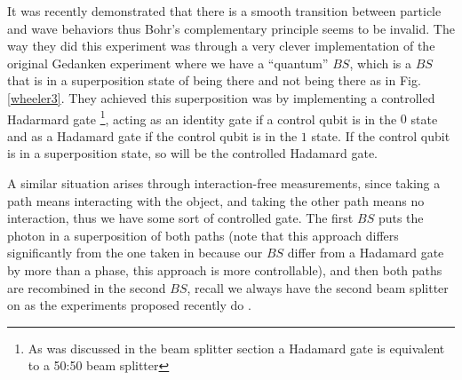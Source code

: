\documentclass[12pt]{book}
\begin{document}
It was recently demonstrated \cite{Peruzzo, Kaiser2012} that there is a smooth transition between particle and wave behaviors thus Bohr's complementary principle seems to be invalid. The way they did this experiment was through a very clever implementation of the original Gedanken experiment where we have a ``quantum'' $BS$, which is a $BS$ that is in a superposition state of being there and not being there as in Fig. \ref{wheeler3}. They achieved this superposition was by implementing a controlled Hadarmard gate \footnote{As was discussed in the beam splitter section a Hadamard gate is equivalent to a 50:50 beam splitter}, acting as an identity gate if a control qubit is in the $0$ state and as a Hadamard gate if the control qubit is in the $1$ state.  If the control qubit is in a superposition state, so will be the controlled Hadamard gate.




A similar situation arises through interaction-free measurements, since taking a path means interacting with the object, and taking the other path means no interaction, thus we have some sort of controlled gate. The first $BS$ puts the photon in a superposition of both paths (note that this approach differs significantly from the one taken in \cite{Peruzzo,Kaiser2012} because our $BS$ differ from a Hadamard gate by more than a phase, this approach is more controllable), and then both paths are recombined in the second $BS$, recall we always have the second beam splitter on as the experiments proposed recently do \cite{Polino}.
\end{document}
